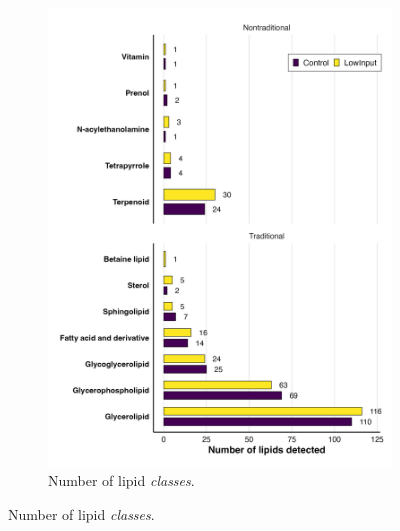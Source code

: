 \documentclass[10pt,letterpaper]{article}
\begin{document}
\begin{figure}[htp]
\begin{subfigure}[t]{0.48\textwidth}
    \includegraphics[width=\linewidth]{fig/supp/SuppFig_3B_Lipid_Class_Counts}
    \caption{Number of lipid \textit{classes}.}
    \label{fig:S3B}
  \end{subfigure}

  \vspace{1em}


\end{figure}
\end{document}
